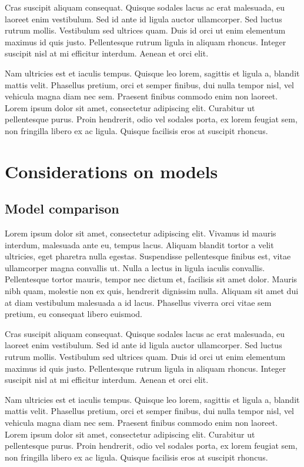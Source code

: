 \documentclass[a4paper, nobind]{templates/ociamthesis}
\theoremstyle{definition}
\theoremstyle{definition}
\theoremstyle{definition}
\theoremstyle{remark}
\begin{document}
Cras suscipit aliquam consequat. Quisque sodales lacus ac erat malesuada, eu laoreet enim vestibulum. Sed id ante id ligula auctor ullamcorper. Sed luctus rutrum mollis. Vestibulum sed ultrices quam. Duis id orci ut enim elementum maximus id quis justo. Pellentesque rutrum ligula in aliquam rhoncus. Integer suscipit nisl at mi efficitur interdum. Aenean et orci elit.

Nam ultricies est et iaculis tempus. Quisque leo lorem, sagittis et ligula a, blandit mattis velit. Phasellus pretium, orci et semper finibus, dui nulla tempor nisl, vel vehicula magna diam nec sem. Praesent finibus commodo enim non laoreet. Lorem ipsum dolor sit amet, consectetur adipiscing elit. Curabitur ut pellentesque purus. Proin hendrerit, odio vel sodales porta, ex lorem feugiat sem, non fringilla libero ex ac ligula. Quisque facilisis eros at suscipit rhoncus.

\hypertarget{chap:considerations-on-models}{%
\section{Considerations on models}\label{chap:considerations-on-models}}

\hypertarget{chap:model-comparison}{%
\subsection{Model comparison}\label{chap:model-comparison}}

Lorem ipsum dolor sit amet, consectetur adipiscing elit. Vivamus id mauris interdum, malesuada ante eu, tempus lacus. Aliquam blandit tortor a velit ultricies, eget pharetra nulla egestas. Suspendisse pellentesque finibus est, vitae ullamcorper magna convallis ut. Nulla a lectus in ligula iaculis convallis. Pellentesque tortor mauris, tempor nec dictum et, facilisis sit amet dolor. Mauris nibh quam, molestie non ex quis, hendrerit dignissim nulla. Aliquam sit amet dui at diam vestibulum malesuada a id lacus. Phasellus viverra orci vitae sem pretium, eu consequat libero euismod.

Cras suscipit aliquam consequat. Quisque sodales lacus ac erat malesuada, eu laoreet enim vestibulum. Sed id ante id ligula auctor ullamcorper. Sed luctus rutrum mollis. Vestibulum sed ultrices quam. Duis id orci ut enim elementum maximus id quis justo. Pellentesque rutrum ligula in aliquam rhoncus. Integer suscipit nisl at mi efficitur interdum. Aenean et orci elit.

Nam ultricies est et iaculis tempus. Quisque leo lorem, sagittis et ligula a, blandit mattis velit. Phasellus pretium, orci et semper finibus, dui nulla tempor nisl, vel vehicula magna diam nec sem. Praesent finibus commodo enim non laoreet. Lorem ipsum dolor sit amet, consectetur adipiscing elit. Curabitur ut pellentesque purus. Proin hendrerit, odio vel sodales porta, ex lorem feugiat sem, non fringilla libero ex ac ligula. Quisque facilisis eros at suscipit rhoncus.
\end{document}
